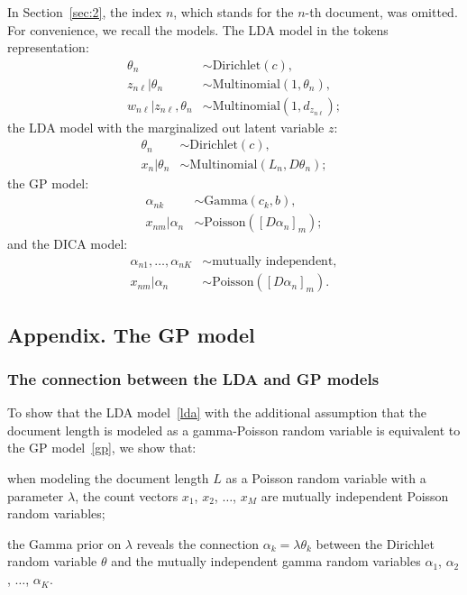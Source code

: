 \documentclass{article}
\newenvironment{mi}{%
  \begin{list}{-}{}
  \let\olditem\item
}{%
  \end{list}
}
\newcommand{\ga}{\alpha}
\newcommand{\gl}{\lambda}
\newcommand{\gt}{\theta}
\newcommand{\poi}{\mathrm{Poisson}}
\newcommand{\dir}{\mathrm{Dirichlet}}
\newcommand{\gam}{\mathrm{Gamma}}
\newcommand{\mul}{\mathrm{Multinomial}}
\begin{document}
In Section~\ref{sec:2}, the index $n$, which stands for the $n$-th document, was omitted. For convenience, we recall the models.
The LDA model in the tokens representation:
\begin{equation}\label{lda-tokens-n}
  \begin{aligned}
    \theta_n &\sim \dir(c), \\
    z_{n\ell}|\theta_n &\sim \mul(1,\theta_n), \\
    w_{n\ell} | z_{n\ell},\theta_n &\sim \mul(1,d_{z_{n\ell}});
  \end{aligned}
\end{equation}
the LDA model with the marginalized out latent variable $z$:
\begin{equation} \label{lda-n}
  \begin{aligned}
    \theta_n &\sim \dir(c), \\
    x_n|\theta_n &\sim \mul(L_n,D\theta_n);
  \end{aligned}
\end{equation}
the GP model:
\begin{equation}\label{gp-n}
  \begin{aligned}
	\ga_{nk} &\sim \gam(c_k,b), \\
	x_{nm}|\ga_n &\sim \poi([D\ga_n]_m);
  \end{aligned}
\end{equation}
and the DICA model:
\begin{equation}\label{dica-n}
  \begin{aligned}
	\ga_{n1},\dots,\ga_{nK} &\sim \text{mutually independent}, \\
	x_{nm}|\ga_n & \sim \poi([D\ga_n]_m).
  \end{aligned}
\end{equation}

\subsection{Appendix. The GP model}
\subsubsection{The connection between the LDA and GP models} \label{sec:ldaproof2}
To show that the LDA model~\eqref{lda} with the additional assumption that the document length is modeled as a gamma-Poisson random variable is equivalent to the GP model~\eqref{gp}, we show that:
\begin{mi}
\item when modeling the document length $L$ as a Poisson random variable with a parameter $\gl$, the count vectors $x_{1}$, $x_{2}$, $\dots$, $x_{M}$ are mutually independent Poisson random variables;
\item the Gamma prior on $\gl$ reveals the connection $\ga_{k} = \gl \gt_{k}$ between the Dirichlet random variable $\gt$ and the mutually independent gamma random variables $\ga_{1}$, $\ga_{2}$, $\dots$, $\ga_{K}$.
\end{mi}
\end{document}
